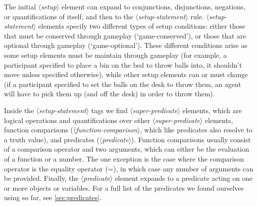 \documentclass{article}
\newcommand{\dsl}[1]{{\it $\langle$#1$\rangle$}}
\begin{document}
The initial \dsl{setup} element can expand to conjunctions, disjunctions, negations, or quantifications of itself, and then to the \dsl{setup-statement} rule.
\dsl{setup-statement} elements specify two different types of setup conditions: either those that must be conserved through gameplay (`game-conserved'), or those that are optional through gameplay (`game-optional').
These different conditions arise as some setup elements must be maintain through gameplay (for example, a participant specified to place a bin on the bed to throw balls into, it shouldn't move unless specified otherwise), while other setup elements can or must change (if a participant specified to set the balls on the desk to throw them, an agent will have to pick them up (and off the desk) in order to throw them).

Inside the \dsl{setup-statement} tags we find \dsl{super-predicate} elements, which are logical operations and quantifications over other \dsl{super-predicate} elements,  function comparisons (\dsl{function-comparison}, which like predicates also resolve to a truth value), and predicates (\dsl{predicate}).
Function comparisons usually consist of a comparison operator and two arguments, which can either be the evaluation of a function or a number.
The one exception is the case where the comparison operator is the equality operator (=), in which case any number of arguments can be provided.
Finally, the \dsl{predicate} element expands to a predicate acting on one or more objects or variables.
For a full list of the predicates we found ourselves using so far, see \autoref{sec:predicates}.
\end{document}
